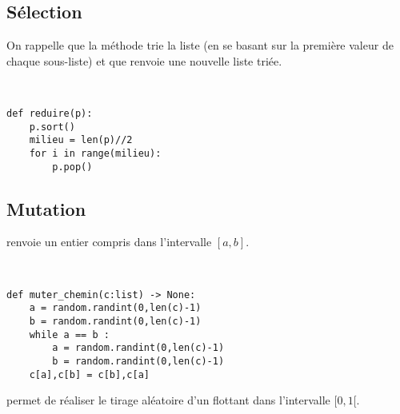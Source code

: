 \subsection{Sélection}
\ifprof
\else
On rappelle que la méthode  trie la liste  (en se basant sur la première valeur de chaque sous-liste) et que  renvoie une nouvelle liste triée.
\fi

\ifprof
\begin{corrige}~\\ \vspace{-.7cm}
\begin{lstlisting}
def reduire(p):
    p.sort()
    milieu = len(p)//2
    for i in range(milieu):
        p.pop()
\end{lstlisting}
\end{corrige}\else
\fi

\subsection{Mutation}
\ifprof
\else
{} renvoie un entier compris dans l'intervalle $[a,b]$.
\fi

\ifprof
\begin{corrige}~\\ \vspace{-.7cm}
\begin{lstlisting}
def muter_chemin(c:list) -> None:
    a = random.randint(0,len(c)-1)
    b = random.randint(0,len(c)-1)
    while a == b : 
        a = random.randint(0,len(c)-1)
        b = random.randint(0,len(c)-1)
    c[a],c[b] = c[b],c[a]
\end{lstlisting}
\end{corrige}\else
\fi

\ifprof
\else
{} permet de réaliser le tirage aléatoire d'un flottant dans l'intervalle $[0,1[$.
\fi

